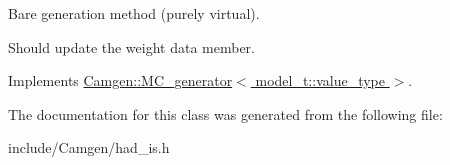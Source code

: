 \textquotesingle{}Bare generation\textquotesingle{} method (purely virtual). 

Should update the weight data member. 

Implements \hyperlink{a00366_a197b7bb66d8de5f6de401f81bea71e6c}{Camgen\+::\+M\+C\+\_\+generator$<$ model\+\_\+t\+::value\+\_\+type $>$}.



The documentation for this class was generated from the following file\+:\begin{DoxyCompactItemize}
\item 
include/\+Camgen/had\+\_\+is.\+h\end{DoxyCompactItemize}
